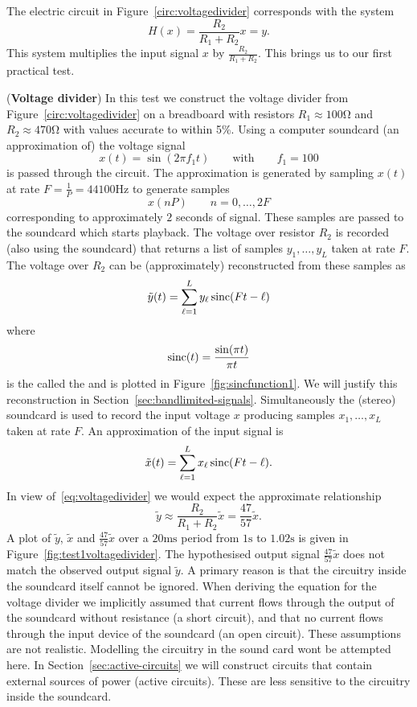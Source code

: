 The electric circuit in Figure~\ref{circ:voltagedivider} corresponds with the system
\[
H(x) = \frac{R_2}{R_1 + R_2} x = y.
\]
This system multiplies the input signal $x$ by $\frac{R_2}{R_1 + R_2}$.  This brings us to our first practical test.

\begin{test}\label{test:voltagedividertest1}
(\textbf{Voltage divider})
In this test we construct the voltage divider from Figure~\ref{circ:voltagedivider} on a breadboard with resistors $R_1 \approx 100\si{\ohm}$ and $R_2 \approx 470\si{\ohm}$ with values accurate to within 5\%.  Using a computer soundcard (an approximation of) the voltage signal 
\[
x(t) = \sin( 2 \pi f_1 t) \qquad  \text{with} \qquad  f_1 = 100
\] 
is passed through the circuit.  The approximation is generated by sampling $x(t)$ at rate $F = \frac{1}{P} = 44100\si{\hertz}$ to generate samples 
\[
x(n P) \qquad n = 0, \dots, 2 F
\]
corresponding to approximately $2$ seconds of signal.  These samples are passed to the soundcard which starts playback.  The voltage over resistor $R_2$ is recorded (also using the soundcard) that returns a list of samples $y_1,\dots,y_L$ taken at rate $F$.  The voltage over $R_2$ can be (approximately) reconstructed from these samples as
\begin{equation}\label{eq:yreconstruct}
\tilde{y}(t) = \sum_{\ell=1}^L y_\ell \operatorname{sinc}( F t - \ell )
\end{equation}
where
\begin{equation}\label{eq:sincfunction}
\operatorname{sinc}(t) = \frac{\sin(\pi t)}{\pi t}
\end{equation}
is the called the  and is plotted in Figure~\ref{fig:sincfunction1}. We will justify this reconstruction in Section~\ref{sec:bandlimited-signals}.  Simultaneously the (stereo) soundcard is used to record the input voltage $x$ producing samples $x_1,\dots,x_L$ taken at rate $F$.  An approximation of the input signal is  
\begin{equation}\label{eq:xreconstruct}
\tilde{x}(t) = \sum_{\ell=1}^L x_\ell \operatorname{sinc}( F t - \ell ).
\end{equation}
In view of~\eqref{eq:voltagedivider} we would expect the approximate relationship
\[
\tilde{y} \approx \frac{R_2}{R_1 + R_2} \tilde{x} = \frac{47}{57}\tilde{x}.
\]
A plot of $\tilde{y}$, $\tilde{x}$ and $\tfrac{47}{57}\tilde{x}$ over a $20\si{\milli\second}$ period from $1\si{\second}$ to $1.02\si{\second}$ is given in Figure~\ref{fig:test1voltagedivider}.  The hypothesised output signal $\tfrac{47}{57}\tilde{x}$ does not match the observed output signal $\tilde{y}$.  A primary reason is that the circuitry inside the soundcard itself cannot be ignored.  When deriving the equation for the voltage divider we implicitly assumed that current flows through the output of the soundcard without resistance (a short circuit), and that no current flows through the input device of the soundcard (an open circuit).  These assumptions are not realistic.  Modelling the circuitry in the sound card wont be attempted here.  In Section~\ref{sec:active-circuits} we will construct circuits that contain external sources of power (active circuits).  These are less sensitive to the circuitry inside the soundcard.  


\end{test}

